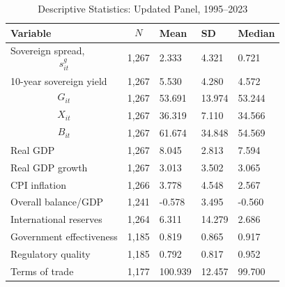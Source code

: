 \begin{table}[H]\centering
\begin{threeparttable}
\caption{Descriptive Statistics: Updated Panel, 1995--2023}
\label{tab:desc_updated}
\scriptsize
\begin{tabularx}{\textwidth}{lYYYY}
\toprule
Variable & $$N$$ & Mean & SD & Median \\
\midrule
Sovereign spread, $$s^g_{it}$$ & 1,267 & 2.333 & 4.321 & 0.721 \\
10-year sovereign yield & 1,267 & 5.530 & 4.280 & 4.572 \\
$$G_{it}$$ & 1,267 & 53.691 & 13.974 & 53.244 \\
$$X_{it}$$ & 1,267 & 36.319 & 7.110 & 34.566 \\
$$B_{it}$$ & 1,267 & 61.674 & 34.848 & 54.569 \\
Real GDP & 1,267 & 8.045 & 2.813 & 7.594 \\
Real GDP growth & 1,267 & 3.013 & 3.502 & 3.065 \\
CPI inflation & 1,266 & 3.778 & 4.548 & 2.567 \\
Overall balance/GDP & 1,241 & -0.578 & 3.495 & -0.560 \\
International reserves & 1,264 & 6.311 & 14.279 & 2.686 \\
Government effectiveness & 1,185 & 0.819 & 0.865 & 0.917 \\
Regulatory quality & 1,185 & 0.792 & 0.817 & 0.952 \\
Terms of trade & 1,177 & 100.939 & 12.457 & 99.700 \\
\bottomrule
\end{tabularx}
\end{threeparttable}
\end{table}
